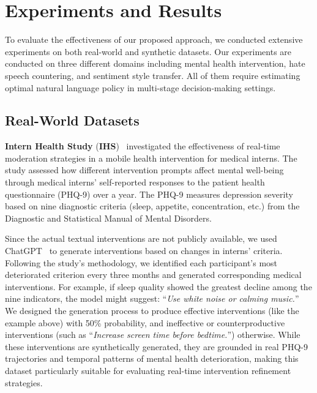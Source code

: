 \documentclass{article}
\begin{document}
\section{Experiments and Results}
\begin{table*}[h!]
\centering
{}
\caption{Overview of datasets and their associated tasks and outcomes.}
\label{tab:datasets}
\end{table*}
To evaluate the effectiveness of our proposed approach, we conducted extensive experiments on both real-world and synthetic datasets. Our experiments are conducted on three different domains including mental health intervention, hate speech countering, and sentiment style transfer. All of them require estimating optimal natural language policy in multi-stage decision-making settings.

\subsection{Real-World Datasets}

\textbf{Intern Health Study} (\textbf{IHS})~\cite{necamp2020assessing} investigated the effectiveness of real-time moderation strategies in a mobile health intervention for medical interns. The study assessed how different intervention prompts affect mental well-being through medical interns' self-reported responses to the patient health questionnaire (PHQ-9) over a year. The PHQ-9 measures depression severity based on nine diagnostic criteria (sleep, appetite, concentration, etc.) from the Diagnostic and Statistical Manual of Mental Disorders\cite{american2013diagnostic}.


Since the actual textual interventions are not publicly available, we used ChatGPT~\cite{ChatGPT} to generate interventions based on changes in interns' criteria. Following the study's methodology, we identified each participant's most deteriorated criterion every three months and generated corresponding medical interventions. For example, if sleep quality showed the greatest decline among the nine indicators, the model might suggest: ``{\it Use white noise or calming music.}'' We designed the generation process to produce effective interventions (like the example above) with 50\% probability, and ineffective or counterproductive interventions (such as ``{\it Increase screen time before bedtime.}'') otherwise. While these interventions are synthetically generated, they are grounded in real PHQ-9 trajectories and temporal patterns of mental health deterioration, making this dataset particularly suitable for evaluating real-time intervention refinement strategies.
\end{document}
